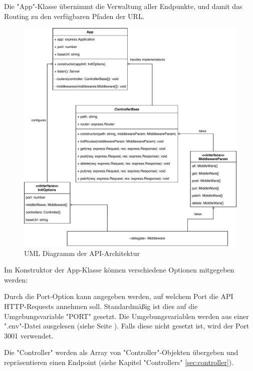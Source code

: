 \label{sec:app}

Die "App"-Klasse übernimmt die Verwaltung aller Endpunkte, und damit das Routing zu den verfügbaren Pfaden der URL. 

\begin{figure}[H]
    \centering
    \includegraphics[width=\textwidth]{media/APITemplate/apiArchitecture.svg.pdf}
    \caption{UML Diagramm der API-Architektur}
    \label{fig:apiUML}
\end{figure}

\pagebreak

Im Konstruktor der App-Klasse können verschiedene Optionen mitgegeben werden:


Durch die Port-Option kann angegeben werden, auf welchem Port die API HTTP-Requests annehmen soll. Standardmäßig ist dies auf die Umgebungsvariable "PORT" gesetzt. Die Umgebungsvariablen werden aus einer ".env"-Datei ausgelesen (siehe Seite \pageref{par:dockerEnvFile}). Falls diese nicht gesetzt ist, wird der Port 3001 verwendet.


Die "Controller" werden als Array von "Controller"-Objekten übergeben und repräsentieren einen Endpoint (siehe Kapitel "Controllers" \ref{sec:controller}).

